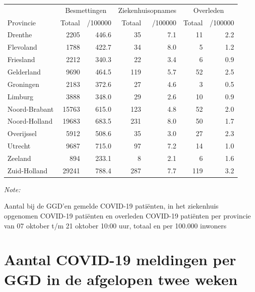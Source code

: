 \documentclass[
  english,
  man,floatsintext]{apa6}
\begin{document}
\begin{table}[H]
\centering
\begin{threeparttable}
\begin{tabular}{lrrrrrr}
\toprule
\multicolumn{1}{c}{ } & \multicolumn{2}{c}{Besmettingen} & \multicolumn{2}{c}{Ziekenhuisopnames} & \multicolumn{2}{c}{Overleden} \\
\cmidrule(l{3pt}r{3pt}){2-3} \cmidrule(l{3pt}r{3pt}){4-5} \cmidrule(l{3pt}r{3pt}){6-7}
Provincie & Totaal & /100000 & Totaal & /100000 & Totaal & /100000\\
\midrule
Drenthe & 2205 & 446.6 & 35 & 7.1 & 11 & 2.2\\
Flevoland & 1788 & 422.7 & 34 & 8.0 & 5 & 1.2\\
Friesland & 2212 & 340.3 & 22 & 3.4 & 6 & 0.9\\
Gelderland & 9690 & 464.5 & 119 & 5.7 & 52 & 2.5\\
Groningen & 2183 & 372.6 & 27 & 4.6 & 3 & 0.5\\
Limburg & 3888 & 348.0 & 29 & 2.6 & 10 & 0.9\\
Noord-Brabant & 15763 & 615.0 & 123 & 4.8 & 52 & 2.0\\
Noord-Holland & 19683 & 683.5 & 231 & 8.0 & 50 & 1.7\\
Overijssel & 5912 & 508.6 & 35 & 3.0 & 27 & 2.3\\
Utrecht & 9687 & 715.0 & 97 & 7.2 & 14 & 1.0\\
Zeeland & 894 & 233.1 & 8 & 2.1 & 6 & 1.6\\
Zuid-Holland & 29241 & 788.4 & 287 & 7.7 & 119 & 3.2\\
\bottomrule
\end{tabular}
\begin{tablenotes}
\item \textit{Note: } 
\item Aantal bij de GGD’en gemelde COVID-19 patiënten, in het ziekenhuis opgenomen COVID-19 patiënten en overleden COVID-19 patiënten per provincie van 07 oktober t/m 21 oktober 10:00 uur, totaal en per 100.000 inwoners
\end{tablenotes}
\end{threeparttable}
\end{table}

\newpage

\hypertarget{aantal-covid-19-meldingen-per-ggd-in-de-afgelopen-twee-weken}{%
\section{Aantal COVID-19 meldingen per GGD in de afgelopen twee weken}\label{aantal-covid-19-meldingen-per-ggd-in-de-afgelopen-twee-weken}}
\end{document}
